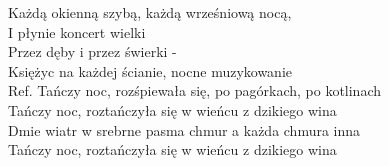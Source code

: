 \begin{flushleft}
Każdą okienną szybą, każdą wrześniową nocą, \\
I płynie koncert wielki \\
Przez dęby i przez świerki - \\
Księżyc na każdej ścianie, nocne muzykowanie \\
\vskip 3mm
Ref. Tańczy noc, rozśpiewała się, po pagórkach, po kotlinach\\
\hspace{0.9cm}Tańczy noc, roztańczyła się w wieńcu z dzikiego wina \\
\hspace{0.9cm}Dmie wiatr w srebrne pasma chmur a każda chmura inna \\
\hspace{0.9cm}Tańczy noc, roztańczyła się w wieńcu z dzikiego wina \\
\end{flushleft}
\clearpage
